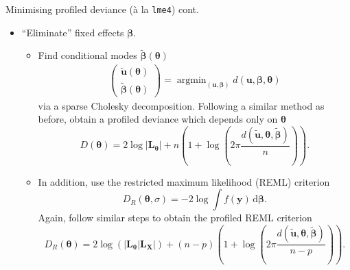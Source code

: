\documentclass[]{beamer}\usepackage[]{graphicx}\usepackage[]{color}
\begin{document}
\begin{frame}{Minimising profiled deviance (à la \texttt{lme4}) cont.}
	\vspace{-1mm}
	\begin{itemize}
		\item ``Eliminate'' fixed effects $\boldsymbol{\beta}$.
		\begin{itemize}
			\item Find conditional modes $\tilde{\boldsymbol{\beta}}(\boldsymbol\theta)$
			\begin{align*}
				\begin{pmatrix}
					\tilde{\mathbf u}(\boldsymbol\theta) \\
					\tilde{\boldsymbol{\beta}}(\boldsymbol\theta)
				\end{pmatrix}
				=
				\mathop{\arg\min}_{(\mathbf u, \boldsymbol{\beta})} d(\mathbf u, \boldsymbol\beta, \boldsymbol\theta)
			\end{align*}
			via a sparse Cholesky decomposition. Following a similar method as before, obtain a profiled deviance which depends only on $\boldsymbol{\theta}$
			\[
				D(\boldsymbol\theta) = 2 \log \vert \mathbf L_{\boldsymbol{\theta}} \vert + n \left( 1 + \log \left(2\pi \frac{d ( \tilde{\mathbf u}, \boldsymbol\theta, \tilde{\boldsymbol\beta})}{n} \right)\right).
			\]

			\pause
			\item In addition, use the restricted maximum likelihood (REML) criterion
			\[
				D_R(\boldsymbol\theta, \sigma) = -2 \log \int f(\mathbf y) \,\text{d} \boldsymbol\beta.
			\]
			Again, follow similar steps to obtain the profiled REML criterion
			\[
				D_R(\boldsymbol\theta) = 2 \log (\vert \mathbf L_{\boldsymbol{\theta}} \vert \mathbf L_{\mathbf X} \vert ) + (n - p) \left( 1 + \log \left(2\pi \frac{d ( \tilde{\mathbf u}, \boldsymbol\theta, \tilde{\boldsymbol\beta})}{n-p} \right)\right).
			\]
		\end{itemize}
	\end{itemize}
\end{frame}
\end{document}
